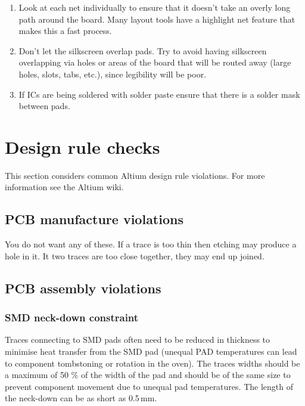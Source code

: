 \begin{enumerate}
\item Look at each net individually to ensure that it doesn't take an
  overly long path around the board. Many layout tools have a
  highlight net feature that makes this a fast process.

\item Don't let the silkscreen overlap pads. Try to avoid having
  silkscreen overlapping via holes or areas of the board that will be
  routed away (large holes, slots, tabs, etc.), since legibility will
  be poor.

\item If ICs are being soldered with solder paste ensure that there is
  a solder mask between pads.
 \end{enumerate}



\section{Design rule checks}


This section considers common Altium design rule violations.  For more
information see the Altium wiki.



\subsection{PCB manufacture violations}

You do not want any of these.  If a trace is too thin then etching may
produce a hole in it.  It two traces are too close together, they may
end up joined.


\subsection{PCB assembly violations}


\subsubsection{SMD neck-down constraint}

Traces connecting to SMD pads often need to be reduced in thickness to
minimise heat transfer from the SMD pad (unequal PAD temperatures can
lead to component tombstoning or rotation in the oven).  The traces
widths should be a maximum of 50 \% of the width of the pad and should
be of the same size to prevent component movement due to unequal pad
temperatures.  The length of the neck-down can be as short as 0.5\,mm.

